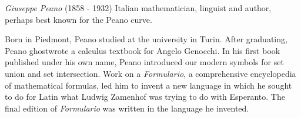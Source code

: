 \documentclass[12pt]{article}
\begin{document}
\emph{Giuseppe Peano} (1858 - 1932) Italian mathematician, linguist and author, perhaps best known for the Peano curve.

Born in Piedmont, Peano studied at the university in Turin. After graduating, Peano ghostwrote a calculus textbook for Angelo Genocchi. In his first book published under his own name, Peano introduced our modern symbols for set union and set intersection. Work on a {\it Formulario}, a comprehensive encyclopedia of mathematical formulas, led him to invent a new language in which he sought to do for Latin what Ludwig Zamenhof was trying to do with Esperanto. The final edition of {\it Formulario} was written in the language he invented.
\end{document}
